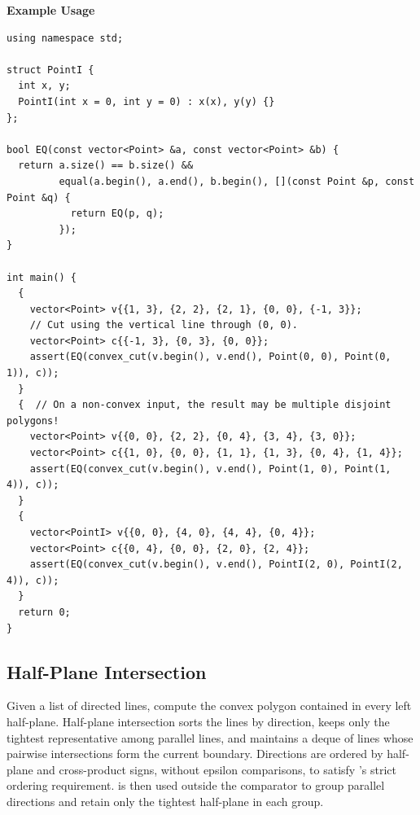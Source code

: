 \textbf{Example Usage}\par
\begin{lstlisting}[style=cpp]
using namespace std;

struct PointI {
  int x, y;
  PointI(int x = 0, int y = 0) : x(x), y(y) {}
};

bool EQ(const vector<Point> &a, const vector<Point> &b) {
  return a.size() == b.size() &&
         equal(a.begin(), a.end(), b.begin(), [](const Point &p, const Point &q) {
           return EQ(p, q);
         });
}

int main() {
  {
    vector<Point> v{{1, 3}, {2, 2}, {2, 1}, {0, 0}, {-1, 3}};
    // Cut using the vertical line through (0, 0).
    vector<Point> c{{-1, 3}, {0, 3}, {0, 0}};
    assert(EQ(convex_cut(v.begin(), v.end(), Point(0, 0), Point(0, 1)), c));
  }
  {  // On a non-convex input, the result may be multiple disjoint polygons!
    vector<Point> v{{0, 0}, {2, 2}, {0, 4}, {3, 4}, {3, 0}};
    vector<Point> c{{1, 0}, {0, 0}, {1, 1}, {1, 3}, {0, 4}, {1, 4}};
    assert(EQ(convex_cut(v.begin(), v.end(), Point(1, 0), Point(1, 4)), c));
  }
  {
    vector<PointI> v{{0, 0}, {4, 0}, {4, 4}, {0, 4}};
    vector<Point> c{{0, 4}, {0, 0}, {2, 0}, {2, 4}};
    assert(EQ(convex_cut(v.begin(), v.end(), PointI(2, 0), PointI(2, 4)), c));
  }
  return 0;
}
\end{lstlisting}
\subsection{Half-Plane Intersection}
\label{sec:7.4.2}
Given a list of directed lines, compute the convex polygon contained in every left half-plane. Half-plane intersection sorts the lines by direction, keeps only the tightest representative among parallel lines, and maintains a deque of lines whose pairwise intersections form the current boundary. Directions are ordered by half-plane and cross-product signs, without epsilon comparisons, to satisfy 's strict ordering requirement.  is then used outside the comparator to group parallel directions and retain only the tightest half-plane in each group.

